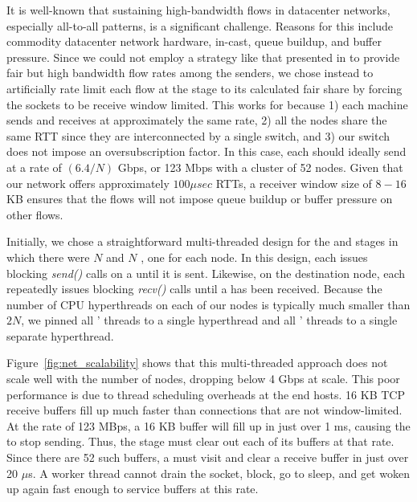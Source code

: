 It is well-known that sustaining high-bandwidth flows in datacenter networks,
especially all-to-all patterns, is a significant challenge.  Reasons for this
include commodity datacenter network hardware, in-cast, queue buildup, and
buffer pressure\cite{dctcp}.  Since we could not employ a strategy like that
presented in \cite{dctcp} to provide fair but high bandwidth flow rates among
the senders, we chose instead to artificially rate limit each flow at the
\sender stage to its calculated fair share by forcing the sockets to be receive
window limited.  This works for \tritonsort because 1) each machine sends and
receives at approximately the same rate, 2) all the nodes share the same RTT
since they are interconnected by a single switch, and 3) our switch
does not impose an oversubscription factor.  In this case, each \sender should
ideally send at a rate of $(6.4 / N)$ Gbps, or 123 Mbps with a cluster of 52
nodes.  Given that our network offers approximately $100 \mu{}sec$ RTTs, a
receiver window size of $8-16$ KB ensures that the flows will not impose queue
buildup or buffer pressure on other flows.

Initially, we chose a straightforward multi-threaded design for the \sender and
\receiver stages in which there were $N$ \senders and $N$ \receivers, one for
each \tritonsort node.  In this design, each \sender issues blocking
\textit{send()} calls on a \nodebuffer until it is sent.  Likewise, on the
destination node, each \receiver repeatedly issues blocking \textit{recv()}
calls until a \nodebuffer has been received.  Because the number of CPU
hyperthreads on each of our nodes is typically much smaller than $2N$, we
pinned all \senders' threads to a single hyperthread and all \receivers'
threads to a single separate hyperthread.

Figure~\ref{fig:net_scalability} shows that this multi-threaded approach does
not scale well with the number of nodes, dropping below 4 Gbps at scale.  This
poor performance is due to thread scheduling overheads at the end hosts.  16 KB
TCP receive buffers fill up much faster than connections that are not
window-limited.  At the rate of 123 MBps, a 16 KB buffer will fill up in just
over 1 ms, causing the \sender to stop sending.  Thus, the \receiver stage must
clear out each of its buffers at that rate.  Since there are 52 such buffers, a
\receiver must visit and clear a receive buffer in just over 20 $\mu$s.  A
\receiver worker thread cannot drain the socket, block, go to sleep, and get
woken up again fast enough to service buffers at this rate.

